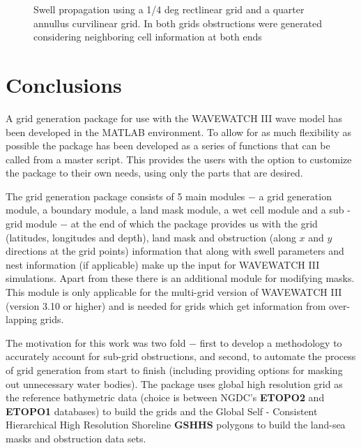 \documentclass[12pt]{article}
\newcommand{\pb}{\strut \vfill \pagebreak}
\newcommand{\bpage}{\vfill \pagebreak \strut

\vspace{2.5in} \centerline{This page is intentionally left blank.}}
\newcommand{\newsec}{\setcounter{equation}{0}
                     \setcounter{myfigno}{0}
                     \setcounter{mytabno}{0}}
\newcounter{myfigno}[section]
\newenvironment{myfig}[1]{\begin{figure}[#1]
                        \refstepcounter{myfigno}}
                       {\end{figure}}
\newcommand{\myfcap}[1]{\begin{list}{\ff Fig. \themyfigno\ :~\hfill}
                      {\rightmargin 8mm \labelsep 0mm
                       \labelwidth 8mm \leftmargin 8mm
                       \topsep 0mm \parskip 0mm \partopsep 0mm }
                       \item \ff #1 \end{list}}
\newcounter{mytabno}[section]
\renewcommand{\themyfigno}{\thesection.\arabic{myfigno}}
\begin{document}
\setcounter{subfigure}{0}
\begin{myfig}{tbp}
\myfcap{Swell propagation using a 1/4 deg rectlinear grid and a quarter annullus curvilinear grid. In both grids obstructions were generated considering neighboring cell information at both ends}
\label{fig:frenchpoly_obscurv}
\end{myfig} 

\pb
\section{Conclusions} \label{sc:concl}
\newsec

A grid generation package for use with the WAVEWATCH III wave model has been developed in the MATLAB environment. To allow for as much flexibility as possible the package has been developed as a series of functions that can be called from a master script. This provides the users with the option to customize the package to their own needs, using only the parts that are desired. 

The grid generation package consists of 5 main modules $-$ a grid generation module, a boundary module, a land mask module, a wet cell module and a sub - grid module $-$ at the end of which the package provides us with the grid (latitudes, longitudes and depth), land mask and obstruction (along $x$ and $y$ directions at the grid points) information that along with swell parameters and nest information (if applicable) make up the input for WAVEWATCH III simulations. Apart from these there is an additional module for modifying masks. This module is only applicable for the multi-grid version of WAVEWATCH III (version 3.10 or higher) and is needed for grids which get information from over-lapping grids. 

The motivation for this work was two fold $-$ first to develop a methodology to accurately account for sub-grid obstructions, and second, to automate the process of grid generation from start to finish (including providing options for masking out unnecessary water bodies). The package uses global high resolution grid as the reference bathymetric data (choice is between NGDC's {\bf ETOPO2} and {\bf ETOPO1} databases) to build the grids and the Global Self - Consistent Hierarchical High Resolution Shoreline {\bf GSHHS} polygons to build the land-sea masks and obstruction data sets. 
  
\end{document}

